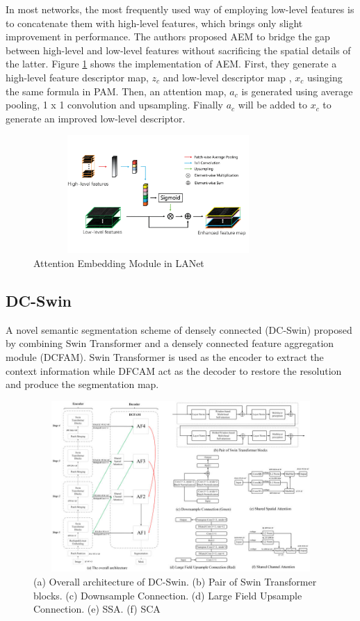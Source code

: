 In most networks, the most frequently used way of employing low-level features is to concatenate them with high-level features, which brings only slight improvement in performance. The authors proposed AEM to bridge the gap between high-level and low-level features without sacrificing the spatial details of the latter. Figure \ref{fig:aem} shows the implementation of AEM. First, they generate a high-level feature descriptor map, $z_c$ and low-level descriptor map , $x_c$ usinging the same formula in PAM. Then, an attention map, $a_c$ is generated using average pooling, 1 x 1 convolution and upsampling. Finally $a_c$ will be added to $x_c$ to generate an improved low-level descriptor.  
\begin{figure}[ht]
\includegraphics[width=9.5cm, height=4.5cm]{images/aem.png}
\centering
\caption{Attention Embedding Module in LANet}
\label{fig:aem}
\end{figure}
\FloatBarrier


\subsection{DC-Swin}
A novel semantic segmentation scheme of densely connected (DC-Swin) \cite{a-novel-transformer} proposed by combining Swin Transformer and a densely connected feature aggregation module (DCFAM). Swin Transformer is used as the encoder to extract the context information while DFCAM act as the decoder to restore the resolution and produce the segmentation map.

\FloatBarrier
\begin{figure}[ht]
\includegraphics[width=12.5cm, height=6.5cm]{images/dc-swin.png}
\centering
\caption{(a) Overall architecture of DC-Swin. (b) Pair of Swin Transformer blocks. (c) Downsample Connection. (d) Large Field Upsample Connection. (e) SSA. (f) SCA}
\label{fig:dc}
\end{figure}


